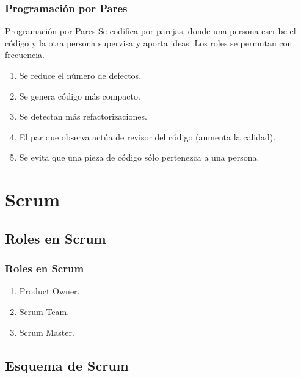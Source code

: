 \documentclass[animated,a4paper,slidestop,xcolor=pst,blue]{beamer}
\begin{document}
\begin{frame}[c]
    \frametitle{Programación por Pares}
    \begin{block}{Programación por Pares}
        Se codifica por parejas, donde una persona escribe el código y la otra persona supervisa y aporta ideas. Los roles se permutan con frecuencia.
    \end{block}
    \begin{enumerate}
        \item<2-> Se reduce el número de defectos.
        \item<3-> Se genera código más compacto.
        \item<4-> Se detectan más refactorizaciones.
        \item<5-> El par que observa actúa de revisor del código (aumenta la calidad).
        \item<6-> Se evita que una pieza de código sólo pertenezca a una persona.
    \end{enumerate}
\end{frame}

\section{Scrum}

\subsection{Roles en Scrum}

\begin{frame}[c]
    \frametitle{Roles en Scrum}
    \begin{enumerate}[<+->]
        \item Product Owner.
        \item Scrum Team.
        \item Scrum Master.
    \end{enumerate}
\end{frame}

\subsection{Esquema de Scrum}
\end{document}
